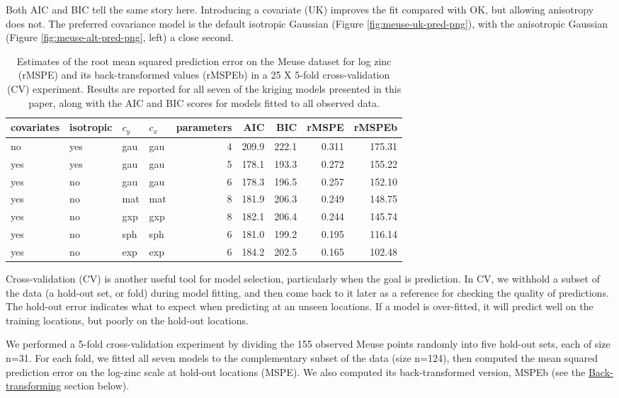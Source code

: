 Both AIC and BIC tell the same story here. Introducing a covariate (UK) improves the fit compared with OK, but allowing anisotropy does not. The preferred covariance model is the default isotropic Gaussian (Figure \ref{fig:meuse-uk-pred-png}), with the anisotropic Gaussian (Figure \ref{fig:meuse-alt-pred-png}, left) a close second.

\begin{table}

\caption{\label{tab:cv-table-latex}Estimates of the root mean squared prediction error on the Meuse dataset for log zinc (rMSPE) and its back-transformed values (rMSPEb) in a 25 X 5-fold cross-validation (CV) experiment. Results are reported for all seven of the kriging models presented in this paper, along with the AIC and BIC scores for models fitted to all observed data.}
\centering
\fontsize{9}{11}\selectfont
\begin{tabular}[t]{llllrrrrr}
\toprule
covariates & isotropic & $c_y$ & $c_x$ & parameters & AIC & BIC & rMSPE & rMSPEb\\
\midrule
no & yes & gau & gau & 4 & 209.9 & 222.1 & 0.311 & 175.31\\
yes & yes & gau & gau & 5 & 178.1 & 193.3 & 0.272 & 155.22\\
yes & no & gau & gau & 6 & 178.3 & 196.5 & 0.257 & 152.10\\
yes & no & mat & mat & 8 & 181.9 & 206.3 & 0.249 & 148.75\\
yes & no & gxp & gxp & 8 & 182.1 & 206.4 & 0.244 & 145.74\\
yes & no & sph & sph & 6 & 181.0 & 199.2 & 0.195 & 116.14\\
yes & no & exp & exp & 6 & 184.2 & 202.5 & 0.165 & 102.48\\
\bottomrule
\end{tabular}
\end{table}

Cross-validation (CV) is another useful tool for model selection, particularly when the goal is prediction. In CV, we withhold a subset of the data (a hold-out set, or fold) during model fitting, and then come back to it later as a reference for checking the quality of predictions. The hold-out error indicates what to expect when predicting at an unseen locations. If a model is over-fitted, it will predict well on the training locations, but poorly on the hold-out locations.

We performed a 5-fold cross-validation experiment by dividing the 155 observed Meuse points randomly into five hold-out sets, each of size n=31. For each fold, we fitted all seven models to the complementary subset of the data (size n=124), then computed the mean squared prediction error on the log-zinc scale at hold-out locations (MSPE). We also computed its back-transformed version, MSPEb (see the \protect\hyperlink{back-transforming}{Back-transforming} section below).

